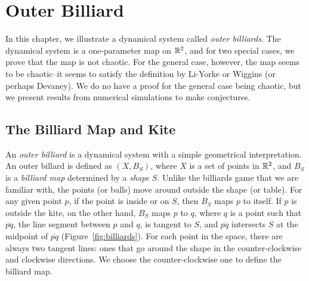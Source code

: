 \documentclass[12pt,twoside]{book}
\begin{document}
\label{chap:billiards}
\chapter{Outer Billiard}
In this chapter, we illustrate a dynamical system called \textit{outer billiards}.
The dynamical system is a one-parameter map on $\mathbb{R}^2$, and for two special cases, we prove that the map is not chaotic.
For the general case, however, the map seems to be chaotic--it seems to satisfy the definition by Li-Yorke or Wiggins (or perhaps Devaney).
We do no have a proof for the general case being chaotic, but we present results from numerical simulations to make conjectures.

\section{The Billiard Map and Kite}
An \textit{outer billiard} is a dynamical system with a simple geometrical interpretation.
An outer billard is defined as $(X, B_S)$, where $X$ is a set of points in $\mathbb{R}^2$, and $B_S$ is a \textit{billiard map} determined by a \textit{shape} $S$.
Unlike the billiards game that we are familiar with, the points (or balls) move around outside the shape (or table).
For any given point $p$, if the point is inside or on $S$, then $B_S$ maps $p$ to itself.
If $p$ is outside the kite, on the other hand, $B_S$ maps $p$ to $q$, where $q$ is a point such that $\overline{pq}$, the line segment between $p$ and $q$, is tangent to $S$, and $\overline{pq}$ intersects $S$ at the midpoint of $\overline{pq}$ (Figure~\ref{fig:billiards}).
For each point in the space, there are always two tangent lines: ones that go around the shape in the counter-clockwise and clockwise directions.
We choose the counter-clockwise one to define the billiard map.
\end{document}
